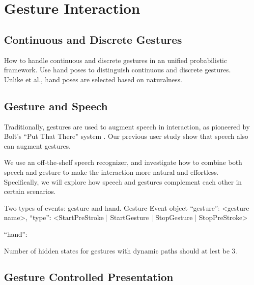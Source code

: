 \chapter{Gesture Interaction}
\section{Continuous and Discrete Gestures}
How to handle continuous and discrete gestures in an unified probabilistic
framework. Use hand poses to distinguish continuous and discrete gestures.
Unlike \cite{Oka02} et al., hand poses are selected based on naturalness.

\section{Gesture and Speech}
Traditionally, gestures are used to augment speech in interaction, as pioneered
by Bolt's ``Put That There'' system \cite{Bolt80}. Our previous user study
\cite{yin10thesis} show that speech also can augment gestures.

We use an off-the-shelf speech 
recognizer, and investigate how to combine both speech and gesture to make
the interaction more natural and effortless. Specifically, we will explore how speech and gestures complement each other in certain scenarios.

Two types of events: gesture and hand.
Gesture Event object
{``gesture'': <gesture name>, ``type'': <StartPreStroke | StartGesture |
StopGesture | StopPreStroke> } 

{``hand'': {} }


Number of hidden states for gestures with dynamic paths should at lest be 3.

\section{Gesture Controlled Presentation}